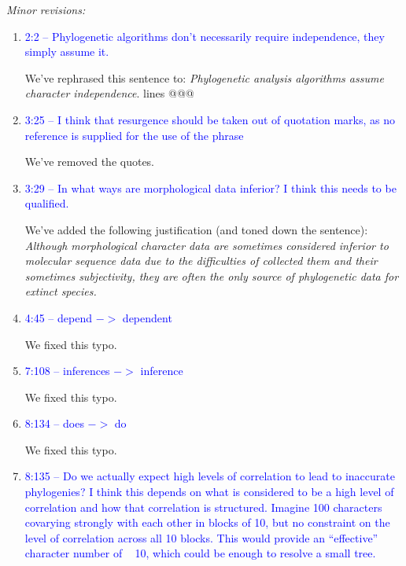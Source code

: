 \documentclass[12pt,letterpaper]{article}
\renewcommand{\subsection}[1]{%
\bigskip
\begin{center}
\begin{large}
\normalfont\itshape #1
\end{large}
\end{center}}
\begin{document}
\subsection{Minor revisions:}

\begin{enumerate}

\item{\textcolor{blue}{2:2 – Phylogenetic algorithms don't necessarily require independence, they simply assume it.}}

We've rephrased this sentence to:
\textit{Phylogenetic analysis algorithms assume character independence}. lines @@@

\item{\textcolor{blue}{3:25 – I think that resurgence should be taken out of quotation marks, as no reference is supplied for the use of the phrase}}

We've removed the quotes.

\item{\textcolor{blue}{3:29 – In what ways are morphological data inferior? I think this needs to be qualified.}}

We've added the following justification (and toned down the sentence):
\textit{Although morphological character data are sometimes considered inferior to molecular sequence data due to the difficulties of collected them and their sometimes subjectivity, they are often the only source of phylogenetic data for extinct species.}

\item{\textcolor{blue}{4:45 – depend $->$ dependent}}

We fixed this typo.

\item{\textcolor{blue}{7:108 – inferences $->$ inference}}

We fixed this typo.

\item{\textcolor{blue}{8:134 – does $->$ do}}

We fixed this typo.

\item{\textcolor{blue}{8:135 – Do we actually expect high levels of correlation to lead to inaccurate phylogenies? I think this depends on what is considered to be a high level of correlation and how that correlation is structured. Imagine 100 characters covarying strongly with each other in blocks of 10, but no constraint on the level of correlation across all 10 blocks. This would provide an ``effective'' character number of ~ 10, which could be enough to resolve a small tree.}}


\end{enumerate}
\end{document}
